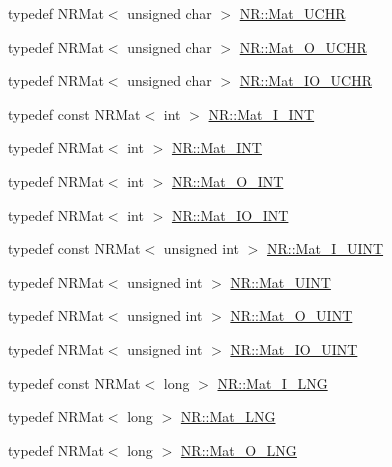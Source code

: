 \begin{DoxyCompactItemize}
\item 
typedef N\+R\+Mat$<$ unsigned char $>$ \mbox{\hyperlink{namespaceNR_a1752fb9659ce8f5ff7e61ac55d858073}{N\+R\+::\+Mat\+\_\+\+U\+C\+HR}}
\item 
typedef N\+R\+Mat$<$ unsigned char $>$ \mbox{\hyperlink{namespaceNR_aaa6b2dfb98d1233de1d71df0c092aced}{N\+R\+::\+Mat\+\_\+\+O\+\_\+\+U\+C\+HR}}
\item 
typedef N\+R\+Mat$<$ unsigned char $>$ \mbox{\hyperlink{namespaceNR_af70383f9e6e29193c2f46b4fa917222f}{N\+R\+::\+Mat\+\_\+\+I\+O\+\_\+\+U\+C\+HR}}
\item 
typedef const N\+R\+Mat$<$ int $>$ \mbox{\hyperlink{namespaceNR_a1e59f4068736f6f8a60d68e927e65a08}{N\+R\+::\+Mat\+\_\+\+I\+\_\+\+I\+NT}}
\item 
typedef N\+R\+Mat$<$ int $>$ \mbox{\hyperlink{namespaceNR_ae015c8943548619daec89e8309eefee7}{N\+R\+::\+Mat\+\_\+\+I\+NT}}
\item 
typedef N\+R\+Mat$<$ int $>$ \mbox{\hyperlink{namespaceNR_aec8b2e2473f3c741647c723acc1fc6d6}{N\+R\+::\+Mat\+\_\+\+O\+\_\+\+I\+NT}}
\item 
typedef N\+R\+Mat$<$ int $>$ \mbox{\hyperlink{namespaceNR_a84800a4c22e55fbe1e67161483bac3a9}{N\+R\+::\+Mat\+\_\+\+I\+O\+\_\+\+I\+NT}}
\item 
typedef const N\+R\+Mat$<$ unsigned int $>$ \mbox{\hyperlink{namespaceNR_af959eaecb622b961ae87ec7258f0fda3}{N\+R\+::\+Mat\+\_\+\+I\+\_\+\+U\+I\+NT}}
\item 
typedef N\+R\+Mat$<$ unsigned int $>$ \mbox{\hyperlink{namespaceNR_a01f5d86042bd4919f04d9a7b6dec8c60}{N\+R\+::\+Mat\+\_\+\+U\+I\+NT}}
\item 
typedef N\+R\+Mat$<$ unsigned int $>$ \mbox{\hyperlink{namespaceNR_a538dd5b6ad9cfb6f7196c64e50f67065}{N\+R\+::\+Mat\+\_\+\+O\+\_\+\+U\+I\+NT}}
\item 
typedef N\+R\+Mat$<$ unsigned int $>$ \mbox{\hyperlink{namespaceNR_aa00c34c0788f7a1ac5f7d7969e4f3cd8}{N\+R\+::\+Mat\+\_\+\+I\+O\+\_\+\+U\+I\+NT}}
\item 
typedef const N\+R\+Mat$<$ long $>$ \mbox{\hyperlink{namespaceNR_a743683745c8482fdcc884b1c720724fc}{N\+R\+::\+Mat\+\_\+\+I\+\_\+\+L\+NG}}
\item 
typedef N\+R\+Mat$<$ long $>$ \mbox{\hyperlink{namespaceNR_ac504afbbcf367d0268a82fb2d9944ff5}{N\+R\+::\+Mat\+\_\+\+L\+NG}}
\item 
typedef N\+R\+Mat$<$ long $>$ \mbox{\hyperlink{namespaceNR_a45b2c8ac10b33b50d1c39bbb7f5be21c}{N\+R\+::\+Mat\+\_\+\+O\+\_\+\+L\+NG}}
\item 

\end{DoxyCompactItemize}
